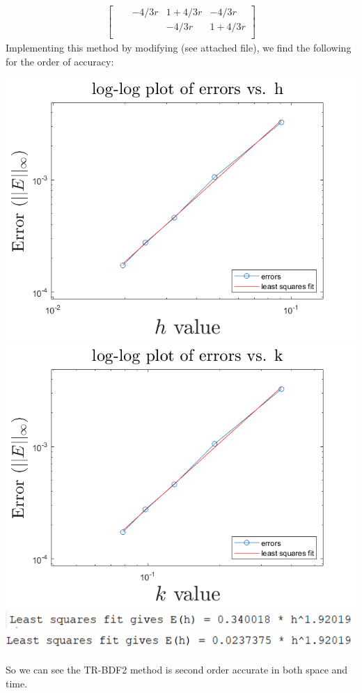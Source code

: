 \documentclass{article}
\begin{document}
\begin{itemize}
\begin{align*}
\begin{bmatrix}
            & & -4/3r & 1 + 4/3r & -4/3r \\
            & & & -4/3r & 1 + 4/3r \\
        \end{bmatrix}
    \end{align*}
    Implementing this method by modifying  (see attached  file), we find the following for the order of accuracy:
    \begin{center}
        \includegraphics[scale= 0.4]{trbdferrGauss.png}
        \includegraphics[scale = 0.4]{kerrTRBDF2Gauss.png}
        \newline
        \includegraphics[scale = 0.6]{horderTRBDF2Gauss.PNG}
        \includegraphics[scale = 0.6]{kerrorderTRBDF2Gauss.PNG}
    \end{center}
    So we can see the TR-BDF2 method is second order accurate in both space and time.
    

\end{itemize}
\end{document}

